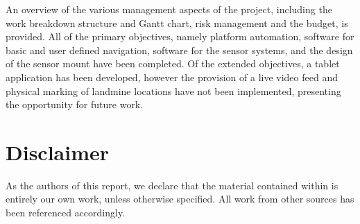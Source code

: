 \documentclass[main.tex]{subfiles}
\begin{document}
An overview of the various management aspects of the project, including the work breakdown structure and Gantt chart, risk management and the budget, is provided. All of the primary objectives, namely platform automation,  software for basic and user defined navigation, software for the sensor systems, and the design of the sensor mount have been completed. Of the extended objectives, a tablet application has been developed, however the provision of a live video feed and physical marking of landmine locations have not been implemented, presenting the opportunity for future work.

\newpage
{}
{}	%
\chapter*{Disclaimer}
As the authors of this report, we declare that the material contained within is entirely our own work, unless otherwise specified. All work from other sources has been referenced accordingly. 
\vspace{0.4in}

\end{document}
